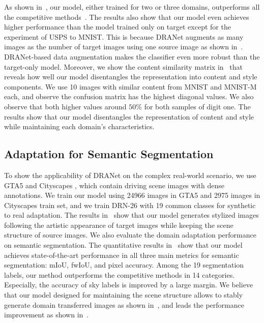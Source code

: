 \documentclass[final]{cvpr}
\begin{document}
As shown in~, our model, either trained for two or three domains, outperforms all the competitive methods~\cite{ye2020light, hoffman2018cycada, bousmalis2017unsupervised, liu2016coupled, tzeng2017adversarial, bousmalis2016domain, ganin2016domain}.
The results also show that our model even achieves higher performance than the model trained only on target except for the experiment of USPS to MNIST.
This is because DRANet augments as many images as the number of target images using one source image as shown in~.
DRANet-based data augmentation makes the classifier even more robust than the target-only model.
Moreover, we show the content similarity matrix in~ that reveals how well our model disentangles the representation into content and style components.
We use 10 images with similar content from MNIST and MNIST-M each, and observe the confusion matrix has the highest diagonal values.
We also observe that both higher values around $50\%$ for both samples of digit one.
The results show that our model disentangles the representation of content and style while maintaining each domain's characteristics.















\subsection{Adaptation for Semantic Segmentation}
\label{sec:driving}
To show the applicability of DRANet on the complex real-world scenario, we use GTA5 \cite{richter2016playing} and Cityscapes \cite{cordts2016cityscapes}, which contain driving scene images with dense annotations.
We train our model using 24966 images in GTA5 and 2975 images in Cityscapes train set, and we train DRN-26 \cite{yu2017dilated} with 19 common classes for synthetic to real adaptation.
The results in~ show that our model generates stylized images following the artistic appearance of target images while keeping the scene structure of source images.
We also evaluate the domain adaptation performance on semantic segmentation. 
The quantitative results in~ show that our model achieves state-of-the-art performance in all three main metrics for semantic segmentation: mIoU, fwIoU, and pixel accuracy.
Among the 19 segmentation labels, our method outperforms the competitive methods in 14 categories.
Especially, the accuracy of sky labels is improved by a large margin.
We believe that our model designed for maintaining the scene structure allows to stably generate domain transferred images as shown in~, and leads the performance improvement as shown in~.
 
\end{document}
